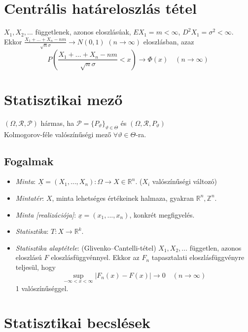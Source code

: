 \documentclass[tikz,12pt,margin=0px]{article}
\newcommand\ddfrac[2]{\frac{\displaystyle #1}{\displaystyle #2}}
\begin{document}
	\section*{Centrális határeloszlás tétel}
	
	$X_1, X_2, ...$ függetlenek, azonos eloszlásúak, $EX_1 = m < \infty$, $D^{2}X_1 = \sigma^2 < \infty$. \\
	Ekkor $\ddfrac{X_1 + ... + X_n - nm}{\sqrt{n}\sigma} \rightarrow N(0,1)$ $(n \to \infty)$ eloszlásban, azaz
    \[
        P\left(\ddfrac{X_1 + ... + X_n - nm}{\sqrt{n}\sigma} < x\right) \rightarrow \Phi(x)\quad (n \to \infty)
    \]
	
	\section*{Statisztikai mező}
	
	$(\Omega, \mathcal{R}, \mathcal{P})$ hármas, ha $\mathcal{P} = \{P_{\vartheta}\}_{\vartheta \in \Theta}$ és $(\Omega, \mathcal{R}, P_{\vartheta})$\\
    Kolmogorov-féle valószínűségi mező $\forall \vartheta \in \Theta$-ra.
	
	\subsection*{Fogalmak}
	
	\begin{itemize}
		\item \textit{Minta}: $\underline{X} = (X_1,...,X_n): \Omega \to X \in \mathbb{R}^n$. ($X_i$ valószínűségi változó)
		\item \textit{Mintatér}: $X$, minta lehetséges értékeinek halmaza, gyakran $\mathbb{R}^n, \mathbb{Z}^n$.
		\item \textit{Minta [realizációja]}: $\underline{x} = (x_1,...,x_n)$, konkrét megfigyelés.
		\item \textit{Statisztika}: $T: X \to \mathbb{R}^k$.
		\item \textit{Statisztika alaptétele}: (Glivenko--Cantelli-tétel) $X_1, X_2, ...$ független, azonos eloszlású $F$ eloszlásfüggvénnyel. Ekkor az $F_n$ tapasztalati eloszlásfüggvényre teljesül, hogy
        \[
            \sup_{-\infty<x<\infty}{|F_n(x) - F(x)|} \to 0 \quad (n \to \infty)
        \]
        1 valószínűséggel.
	\end{itemize}
	
	\section*{Statisztikai becslések}
	
\end{document}
